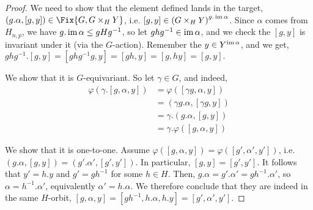 \begin{proof}
	We need to show that the element defined lands in the target, $\left(g. \alpha, \left[g, y\right]\right) \in \Fix{G, G \times_H Y}$, i.e. $\left[g, y\right] \in \left(G \times_H Y\right)^{g. \operatorname{im} \alpha}$.
	Since $\alpha$ comes from $H_{n,p}$, we have $g. \operatorname{im} \alpha \leq gHg^{-1}$, so let $ghg^{-1} \in \operatorname{im} \alpha$, and we check the $\left[g, y\right]$ is invariant under it (via the $G$-action).
	Remember the $y \in Y^{\operatorname{im} \alpha}$, and we get,
	$
	ghg^{-1}.\left[g, y\right]
	= \left[ghg^{-1} g, y\right]
	= \left[gh, y\right]
	= \left[g, hy\right]
	= \left[g, y\right].
	$
	
	We show that it is $G$-equivariant.
	So let $\gamma \in G$, and indeed,
	\begin{align*}
		\varphi\left(\gamma. \left[g, \alpha, y\right]\right)
		&= \varphi\left(\left[\gamma g, \alpha, y\right]\right)\\
		&= \left(\gamma g. \alpha, \left[\gamma g, y\right]\right)\\
		&= \gamma. \left(g. \alpha, \left[g, y\right]\right)\\
		&= \gamma. \varphi\left(\left[g, \alpha, y\right]\right)
	\end{align*}
	
	We show that it is one-to-one.
	Assume $\varphi\left(\left[g, \alpha, y\right]\right) = \varphi\left(\left[g', \alpha', y'\right]\right)$,
	i.e. $\left(g. \alpha, \left[g, y\right]\right) = \left(g'. \alpha', \left[g', y'\right]\right)$.
	In particular, $\left[g, y\right] = \left[g', y'\right]$.
	It follows that $y' = h.y$ and $g' = gh^{-1}$ for some $h \in H$.
	Then, $g. \alpha = g'. \alpha' = gh^{-1}. \alpha'$, so $\alpha = h^{-1}. \alpha'$, equivalently $\alpha' = h. \alpha$.
	We therefore conclude that they are indeed in the same $H$-orbit,
	$
	\left[g, \alpha, y\right]
	= \left[gh^{-1}, h.\alpha, h.y\right]
	= \left[g', \alpha', y'\right]
	$.
	

\end{proof}
